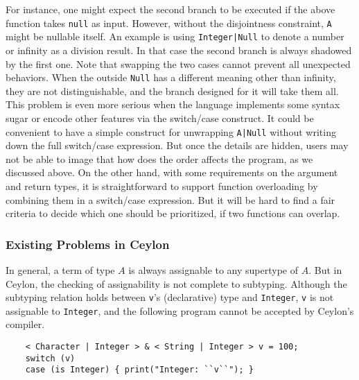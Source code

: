 For instance, one might expect the second branch to be executed if the above
function takes \lstinline{null} as input.
However, without the disjointness constraint, \lstinline{A} might be nullable itself.
An example is using \lstinline{Integer|Null} to denote a number or infinity
as a division result.
In that case the second branch is always shadowed by the first one.
Note that swapping the two cases cannot prevent all unexpected behaviors.
When the outside \lstinline{Null} has a different meaning other than infinity,
they are not distinguishable, and the branch designed for it will take them all.
This problem is even more serious when the language implements some syntax
sugar or encode other features via the switch/case construct.
It could be convenient to have a simple construct for unwrapping \lstinline{A|Null} without writing down the full switch/case expression.
But once the details are hidden, users may not be able to image that how does
the order affects the program, as we discussed above.  
On the other hand, with some requirements on the argument and return types, it is 
straightforward to support function overloading by combining them in a switch/case expression.
But it will be hard to find a fair criteria to decide which one
should be prioritized, if two functions can overlap.

\subsubsection*{Existing Problems in Ceylon}

In general, a term of type $A$ is always assignable to any supertype of $A$.
But in Ceylon, the checking of assignability is not complete to
subtyping.
Although the subtyping relation holds between \lstinline{v}'s
(declarative) type and \lstinline{Integer}, \lstinline{v}
is not assignable to \lstinline{Integer}, and the following program
cannot be accepted by Ceylon's compiler.

\begin{lstlisting}
	< Character | Integer > & < String | Integer > v = 100;
	switch (v)
	case (is Integer) { print("Integer: ``v``"); }
\end{lstlisting}

